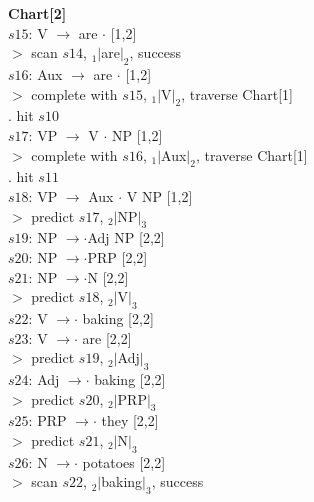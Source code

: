 \documentclass[twoside,11pt]{homework}
\begin{document}
\begin{solution}
  \textbf{Chart[2]}\\
  $s15$: V $\rightarrow$ are $\cdot$ [1,2]\\
  $>$ scan $s14$, $_1|$are$|_2$, success\\
  $s16$: Aux $\rightarrow$ are $\cdot$ [1,2]\\
  $>$ complete with $s15$, $_1|$V$|_2$, traverse Chart[1]\\
  $.$ hit $s10$\\
  $s17$: VP $\rightarrow$ V $\cdot$ NP [1,2]\\
  $>$ complete with $s16$, $_1|$Aux$|_2$, traverse Chart[1]\\
  $.$ hit $s11$\\
  $s18$: VP $\rightarrow$ Aux $\cdot$ V NP [1,2]\\
  $>$ predict $s17$, $_2|$NP$|_3$\\
  $s19$: NP $\rightarrow \cdot$Adj NP [2,2]\\
  $s20$: NP $\rightarrow \cdot$PRP [2,2]\\
  $s21$: NP $\rightarrow \cdot$N [2,2]\\
  $>$ predict $s18$, $_2|$V$|_3$\\
  $s22$: V $\rightarrow \cdot$ baking [2,2]\\
  $s23$: V $\rightarrow \cdot$ are [2,2]\\
  $>$ predict $s19$, $_2|$Adj$|_3$\\
  $s24$: Adj $\rightarrow \cdot$ baking [2,2]\\
  $>$ predict $s20$, $_2|$PRP$|_3$\\
  $s25$: PRP $\rightarrow \cdot$ they [2,2]\\
  $>$ predict $s21$, $_2|$N$|_3$\\
  $s26$: N $\rightarrow \cdot$ potatoes [2,2]\\
  $>$ scan $s22$, $_2|$baking$|_3$, success\\


\end{solution}
\end{document}

